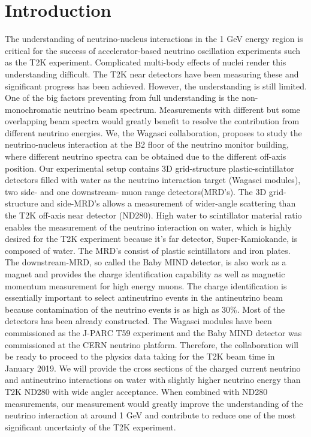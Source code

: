 \section{Introduction}

The understanding of neutrino-nucleus interactions in the 1 GeV energy region is critical for the success
of accelerator-based neutrino oscillation experiments such as the T2K experiment.
Complicated multi-body effects of nuclei render this understanding difficult.
The T2K near detectors have been measuring these and significant progress has been achieved.
However, the understanding is still limited.
One of the big factors preventing from full understanding is the non-monochromatic
neutrino beam spectrum.
Measurements with different but some overlapping beam spectra would greatly benefit to resolve the contribution
from different neutrino energies.
We, the Wagasci collaboration, proposes to study the neutrino-nucleus interaction
at the B2 floor of the neutrino monitor building, where different neutrino spectra
can be obtained due to the different off-axis position.
Our experimental setup contains 3D grid-structure plastic-scintillator detectors filled with water as the neutrino interaction target
(Wagasci modules), two side- and one downstream- muon range detectors(MRD's).
The 3D grid-structure and side-MRD's allows a measurement of  wider-angle scattering than the T2K off-axis near detector (ND280).
High water to scintillator material ratio enables the measurement of the neutrino interaction on water, which
is highly desired for the T2K experiment because it's far detector, Super-Kamiokande, is composed of water.
The MRD's consist of plastic scintillators and iron plates.
The downstream-MRD, so called the Baby MIND detector, is also work as a magnet and provides the charge identification capability as well as magnetic momentum measurement for high energy muons.
The charge identification is essentially important to select antineutrino events in the antineutrino beam
because contamination of the neutrino events is as high as 30\%.
Most of the detectors has been already constructed.
The Wagasci modules have been commissioned as the J-PARC T59 experiment and the Baby MIND detector was commissioned at the CERN neutrino platform.
Therefore, the collaboration will be ready to proceed to the physics data taking for the T2K beam time in January 2019.
We will provide the cross sections of the charged current neutrino and antineutrino interactions on water
with slightly higher neutrino energy than T2K ND280 with wide angler acceptance.
When combined with ND280 measurements, our measurement would greatly improve the understanding of the neutrino interaction
at around 1 GeV and contribute to reduce one of the most significant uncertainty of the T2K experiment.
